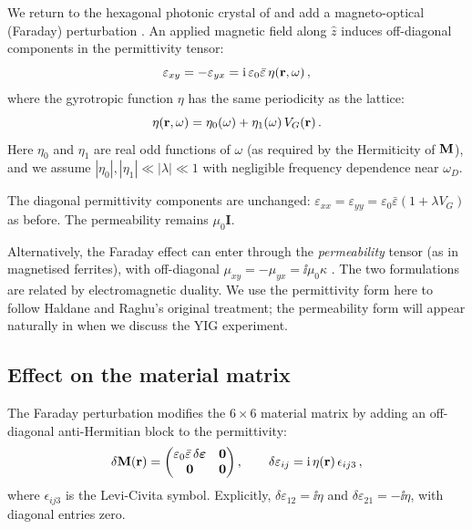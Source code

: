 We return to the hexagonal photonic crystal of
 and add a magneto-optical (Faraday)
perturbation
\cite{he2016photonic}.  An applied magnetic field along $\hat{z}$ induces
off-diagonal components in the permittivity tensor:
\begin{equation}\label{eq:ch7-faraday-eps}
  \varepsilon_{xy} = -\varepsilon_{yx}
  = \mathrm{i}\,\varepsilon_0\bar\varepsilon\,\eta(\mathbf{r},\omega)\,,
\end{equation}
where the gyrotropic function $\eta$ has the same periodicity as the
lattice:
\begin{equation}\label{eq:ch7-eta}
  \eta(\mathbf{r},\omega) = \eta_0(\omega) + \eta_1(\omega)\,V_G(\mathbf{r})\,.
\end{equation}
Here $\eta_0$ and $\eta_1$ are real odd functions of $\omega$ (as
required by the Hermiticity of $\mathbf{M}$), and we assume
$|\eta_0|,|\eta_1|\ll|\lambda|\ll 1$ with negligible frequency
dependence near $\omega_D$.

The diagonal permittivity components are unchanged:
$\varepsilon_{xx}=\varepsilon_{yy}=\varepsilon_0\bar\varepsilon(1+\lambda V_G)$
as before.  The permeability remains $\mu_0\mathbf{I}$.

\begin{remark}
Alternatively, the Faraday effect can enter through the
\emph{permeability} tensor (as in magnetised ferrites), with
off-diagonal $\mu_{xy}=-\mu_{yx}=\ii\mu_0\kappa$
\cite{wang2007reflection}.  The two formulations
are related by electromagnetic duality.  We use the permittivity form
here to follow Haldane and Raghu's original treatment; the permeability
form will appear naturally in  when we
discuss the YIG experiment.
\end{remark}

\subsection{Effect on the material matrix}
\label{sec:ch7-material-matrix}

The Faraday perturbation modifies the $6\times 6$ material matrix by
adding an off-diagonal anti-Hermitian block to the permittivity:
\begin{equation}\label{eq:ch7-delta-M}
  \delta\mathbf{M}(\mathbf{r}) =
  \begin{pmatrix}
    \varepsilon_0\bar\varepsilon\,\delta\boldsymbol{\varepsilon} & \mathbf{0} \\
    \mathbf{0} & \mathbf{0}
  \end{pmatrix},
  \qquad
  \delta\varepsilon_{ij} = \mathrm{i}\,\eta(\mathbf{r})\,\epsilon_{ij3}\,,
\end{equation}
where $\epsilon_{ij3}$ is the Levi-Civita symbol.
Explicitly, $\delta\varepsilon_{12}=\ii\eta$ and
$\delta\varepsilon_{21}=-\ii\eta$, with diagonal entries zero.

